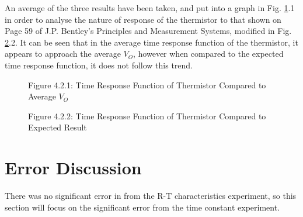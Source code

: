 \documentclass[a4,11pt]{article}
\begin{document}
An average of the three results have been taken, and put into a graph in Fig. \ref{fig:timeresponseresult}.1 in order to analyse the nature of response of the thermistor to that shown on Page 59 of J.P. Bentley's Principles and Measurement Systems, modified in Fig. \ref{fig:timeresponseideal}.2. It can be seen that in the average time response function of the thermistor, it appears to approach the average $V_O$, however when compared to the expected time response function, it does not follow this trend.

\begin{figure}[H]
	\centering
	\label{fig:timeresponseresult}
	Figure 4.2.1: Time Response Function of Thermistor Compared to Average $V_O$
\end{figure}

\begin{figure}[H]
	\centering
	\label{fig:timeresponseideal}
	Figure 4.2.2: Time Response Function of Thermistor Compared to Expected Result
\end{figure}

\section{Error Discussion}
\label{sec:error}
There was no significant error in from the R-T characteristics experiment, so this section will focus on the significant error from the time constant experiment.
\end{document}
